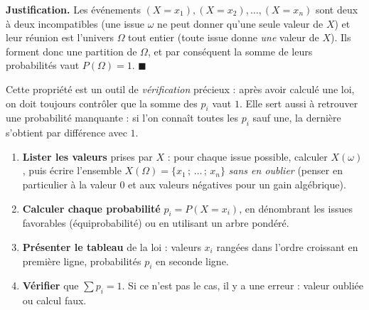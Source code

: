 \documentclass[11pt]{article}
\begin{document}
\textbf{Justification.} Les événements $(X = x_1), (X = x_2), \dots, (X = x_n)$ sont deux à deux incompatibles (une issue $\omega$ ne peut donner qu'une seule valeur de $X$) et leur réunion est l'univers $\Omega$ tout entier (toute issue donne \emph{une} valeur de $X$). Ils forment donc une partition de $\Omega$, et par conséquent la somme de leurs probabilités vaut $P(\Omega) = 1$. $\blacksquare$

Cette propriété est un outil de \emph{vérification} précieux : après avoir calculé une loi, on doit toujours contrôler que la somme des $p_i$ vaut $1$. Elle sert aussi à retrouver une probabilité manquante : si l'on connaît toutes les $p_i$ sauf une, la dernière s'obtient par différence avec $1$.

\begin{methode}
\begin{enumerate}
\item \textbf{Lister les valeurs} prises par $X$ : pour chaque issue possible, calculer $X(\omega)$, puis écrire l'ensemble $X(\Omega) = \{x_1\,;\,\dots\,;\,x_n\}$ \emph{sans en oublier} (penser en particulier à la valeur $0$ et aux valeurs négatives pour un gain algébrique).
\item \textbf{Calculer chaque probabilité} $p_i = P(X = x_i)$, en dénombrant les issues favorables (équiprobabilité) ou en utilisant un arbre pondéré.
\item \textbf{Présenter le tableau} de la loi : valeurs $x_i$ rangées dans l'ordre croissant en première ligne, probabilités $p_i$ en seconde ligne.
\item \textbf{Vérifier} que $\sum p_i = 1$. Si ce n'est pas le cas, il y a une erreur : valeur oubliée ou calcul faux.
\end{enumerate}
\end{methode}
\end{document}
